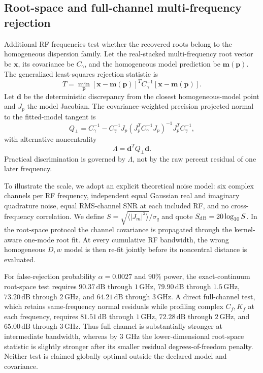 \documentclass[aps,pra,twocolumn,superscriptaddress,nofootinbib]{revtex4-2}
\begin{document}


\subsection{Root-space and full-channel multi-frequency rejection}

Additional RF frequencies test whether the recovered roots belong to the homogeneous dispersion family. Let the real-stacked multi-frequency root vector be $\bm x$, its covariance be $C_\gamma$, and the homogeneous model prediction be $\bm m(\bm p)$. The generalized least-squares rejection statistic is
\begin{equation}
\boxed{
T=\min_{\bm p}
[\bm x-\bm m(\bm p)]^T
C_\gamma^{-1}
[\bm x-\bm m(\bm p)].
}
\label{eq:teststat}
\end{equation}
Let $\bm d$ be the deterministic discrepancy from the closest homogeneous-model point and $J_p$ the model Jacobian. The covariance-weighted precision projected normal to the fitted-model tangent is
\begin{equation}
Q_\perp=C_\gamma^{-1}
-C_\gamma^{-1}J_p
(J_p^TC_\gamma^{-1}J_p)^{-1}
J_p^TC_\gamma^{-1},
\end{equation}
with alternative noncentrality
\begin{equation}
\boxed{
\Lambda=\bm d^TQ_\perp\bm d.
}
\label{eq:lambda}
\end{equation}
Practical discrimination is governed by $\Lambda$, not by the raw percent residual of one later frequency.

To illustrate the scale, we adopt an explicit theoretical noise model: six complex channels per RF frequency, independent equal Gaussian real and imaginary quadrature noise, equal RMS-channel SNR at each included RF, and no cross-frequency correlation. We define $S=\sqrt{\langle|J_m|^2\rangle}/\sigma_q$ and quote $S_{\rm dB}=20\log_{10}S$. In the root-space protocol the channel covariance is propagated through the kernel-aware one-mode root fit. At every cumulative RF bandwidth, the wrong homogeneous $D,w$ model is then re-fit jointly before its noncentral distance is evaluated.

For false-rejection probability $\alpha=0.0027$ and $90\%$ power, the exact-continuum root-space test requires $90.37\,\mathrm{dB}$ through $1\,\mathrm{GHz}$, $79.90\,\mathrm{dB}$ through $1.5\,\mathrm{GHz}$, $73.20\,\mathrm{dB}$ through $2\,\mathrm{GHz}$, and $64.21\,\mathrm{dB}$ through $3\,\mathrm{GHz}$. A direct full-channel test, which retains same-frequency normal residuals while profiling complex $C_f,K_f$ at each frequency, requires $81.51\,\mathrm{dB}$ through $1\,\mathrm{GHz}$, $72.28\,\mathrm{dB}$ through $2\,\mathrm{GHz}$, and $65.00\,\mathrm{dB}$ through $3\,\mathrm{GHz}$. Thus full channel is substantially stronger at intermediate bandwidth, whereas by 3 GHz the lower-dimensional root-space statistic is slightly stronger after its smaller residual degrees-of-freedom penalty. Neither test is claimed globally optimal outside the declared model and covariance.
\end{document}
